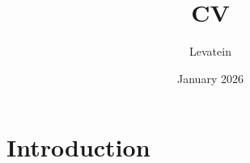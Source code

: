 \documentclass{article}
\title{CV}
\author{Levatein }
\date{January 2026}
\begin{document}
\maketitle

\section{Introduction}
\end{document}
